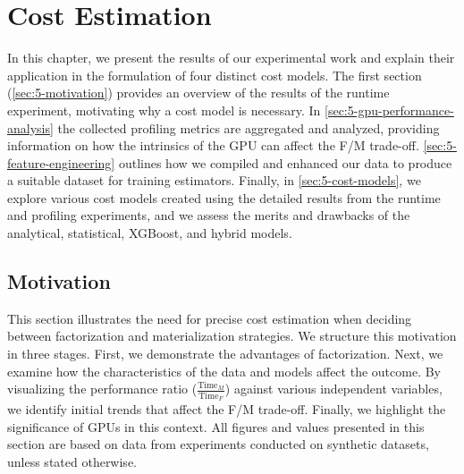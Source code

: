 
\chapter{Cost Estimation}

\label{chapter:cost-estimation}
In this chapter, we present the results of our experimental work and explain their application in the formulation of four distinct cost models. The first section (\autoref{sec:5-motivation}) provides an overview of the results of the runtime experiment, motivating why a cost model is necessary. In \autoref{sec:5-gpu-performance-analysis} the collected profiling metrics are aggregated and analyzed, providing information on how the intrinsics of the GPU can affect the F/M trade-off. \autoref{sec:5-feature-engineering} outlines how we compiled and enhanced our data to produce a suitable dataset for training estimators. Finally, in \autoref{sec:5-cost-models}, we explore various cost models created using the detailed results from the runtime and profiling experiments, and we assess the merits and drawbacks of the analytical, statistical, XGBoost, and hybrid models.

\section{Motivation}
\label{sec:5-motivation}

This section illustrates the need for precise cost estimation when deciding between factorization and materialization strategies. We structure this motivation in three stages. First, we demonstrate the advantages of factorization. Next, we examine how the characteristics of the data and models affect the outcome. By visualizing the performance ratio ($\frac{\text{Time}_M}{\text{Time}_F}$) against various independent variables, we identify initial trends that affect the F/M trade-off. Finally, we highlight the significance of GPUs in this context. All figures and values presented in this section are based on data from experiments conducted on synthetic datasets, unless stated otherwise.

